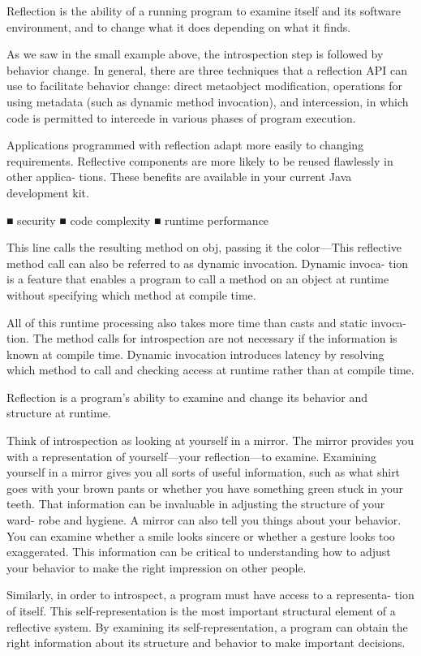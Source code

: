 Reflection is the ability of a running program to examine itself and its software environment, and to change what it does depending on what it finds.

As we saw in the small example above, the introspection step is followed by behavior change. In general, there are three techniques that a reflection API can use to facilitate behavior change: direct metaobject modification, operations for using metadata (such as dynamic method invocation), and intercession, in which code is permitted to intercede in various phases of program execution.

Applications programmed with reflection adapt more easily to changing requirements. Reflective components are more likely to be reused flawlessly in other applica- tions. These benefits are available in your current Java development kit.


■ security
■ code complexity
■ runtime performance


This line calls the resulting method on obj, passing it the color—This reflective method call can also be referred to as dynamic invocation. Dynamic invoca- tion is a feature that enables a program to call a method on an object at runtime without specifying which method at compile time.

All of this runtime processing also takes more time than casts and static invoca- tion. The method calls for introspection are not necessary if the information is known at compile time. Dynamic invocation introduces latency by resolving which method to call and checking access at runtime rather than at compile time. 

Reflection is a program’s ability to examine and change its behavior and structure at runtime. 

Think of introspection as looking at yourself in a mirror. The mirror provides you with a representation of yourself—your reflection—to examine. Examining yourself in a mirror gives you all sorts of useful information, such as what shirt goes with your brown pants or whether you have something green stuck in your teeth. That information can be invaluable in adjusting the structure of your ward- robe and hygiene. A mirror can also tell you things about your behavior. You can examine whether a smile looks sincere or whether a gesture looks too exaggerated. This information can be critical to understanding how to adjust your behavior to make the right impression on other people.


Similarly, in order to introspect, a program must have access to a representa- tion of itself. This self-representation is the most important structural element of a reflective system. By examining its self-representation, a program can obtain the right information about its structure and behavior to make important decisions.

